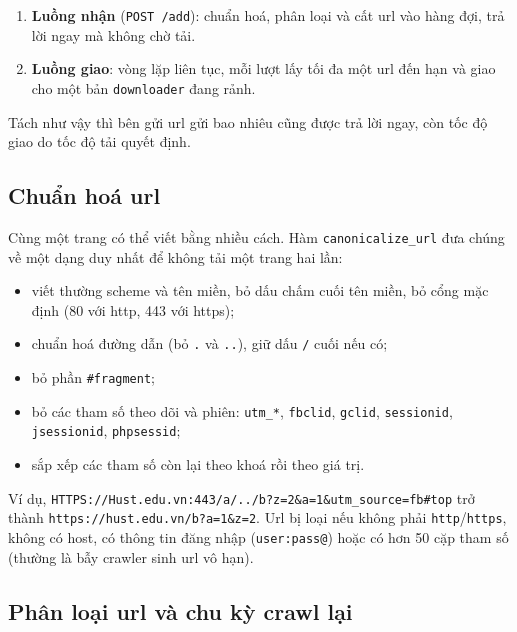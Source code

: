 \documentclass[12pt,a4paper]{report}
\begin{document}
\begin{enumerate}
  \item \textbf{Luồng nhận} (\texttt{POST /add}): chuẩn hoá, phân loại và cất url vào hàng đợi, trả lời ngay mà không
        chờ tải.
  \item \textbf{Luồng giao}: vòng lặp liên tục, mỗi lượt lấy tối đa một url đến hạn và giao cho một bản
        \texttt{downloader} đang rảnh.
\end{enumerate}

Tách như vậy thì bên gửi url gửi bao nhiêu cũng được trả lời ngay, còn tốc độ giao do tốc độ tải quyết định.

\subsection{Chuẩn hoá url}

Cùng một trang có thể viết bằng nhiều cách. Hàm \texttt{canonicalize\_\allowbreak{}url} đưa chúng về một dạng duy nhất để không tải
một trang hai lần:

\begin{itemize}
  \item viết thường scheme và tên miền, bỏ dấu chấm cuối tên miền, bỏ cổng mặc định (80 với http, 443 với https);
  \item chuẩn hoá đường dẫn (bỏ \texttt{.} và \texttt{..}), giữ dấu \texttt{/} cuối nếu có;
  \item bỏ phần \texttt{\#fragment};
  \item bỏ các tham số theo dõi và phiên: \texttt{utm\_\allowbreak{}*}, \texttt{fbclid}, \texttt{gclid}, \texttt{sessionid},
        \texttt{jsessionid}, \texttt{phpsessid};
  \item sắp xếp các tham số còn lại theo khoá rồi theo giá trị.
\end{itemize}

\begin{sloppypar}
Ví dụ, \texttt{HTTPS://Hust.edu.vn:443/a/../b?z=2\&a=1\&\allowbreak utm\_\allowbreak{}source=fb\#top} trở thành
\texttt{https://hust.edu.vn/b?\allowbreak a=1\&z=2}. Url bị loại nếu không phải \texttt{http}/\texttt{https}, không có host, có
thông tin đăng nhập (\texttt{user:pass@}) hoặc có hơn 50 cặp tham số (thường là bẫy crawler sinh url vô hạn).
\end{sloppypar}

\subsection{Phân loại url và chu kỳ crawl lại}
\end{document}
